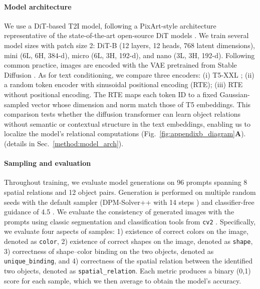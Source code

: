 \paragraph{Model architecture}
We use a DiT-based T2I model, following a PixArt-style architecture representative of the state-of-the-art open-source DiT models \citep{chen2023PixArtAlpha}. We train several model sizes with patch size 2: DiT-B (12 layers, 12 heads, 768 latent dimensions), mini (6L, 6H, 384-d), micro (6L, 3H, 192-d), and nano (3L, 3H, 192-d). Following common practice, images are encoded with the VAE pretrained from Stable Diffusion \citep{Rombach2022LatentDiffusion}.
As for text conditioning, we compare three encoders: (i) T5-XXL \citep{Raffel2023T5Model}; (ii) a random token encoder with sinusoidal positional encoding (RTE);
(iii) RTE without positional encoding.
The RTE maps each token ID to a fixed Gaussian-sampled vector whose dimension and norm match those of T5 embeddings.
This comparison tests whether the diffusion transformer can learn object relations without semantic or contextual structure in the text embeddings, enabling us to localize the model's relational computations (Fig.~\ref{fig:appendixb_diagram}\textbf{A}). (details in Sec.~\ref{method:model_arch}).

\paragraph{Sampling and evaluation}
Throughout training, we evaluate model generations on 96 prompts spanning 8 spatial relations and 12 object pairs. Generation is performed on multiple random seeds with the default sampler (DPM-Solver++ with 14 steps \citep{lu2022dpm++}) and classifier-free guidance of 4.5 \citep{ho2022classifierFreeGuidance}. We evaluate the consistency of generated images with the prompts using classic segmentation and classification tools from \texttt{cv2} \cite{bradski2000opencv}.
Specifically, we evaluate four aspects of samples: 1) existence of correct colors on the image, denoted as \texttt{color}, 2) existence of correct shapes on the image, denoted as \texttt{shape}, 3) correctness of shape--color binding on the two objects, denoted as \texttt{unique\_binding}, and 4) correctness of the spatial relation between the identified two objects, denoted as \texttt{spatial\_relation}.
Each metric produces a binary (0,1) score for each sample, which we then average to obtain the model's accuracy.

